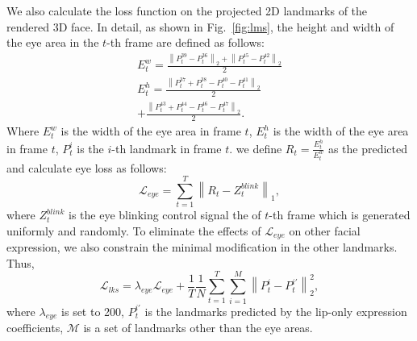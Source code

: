 We also calculate the loss function on the projected 2D landmarks of the rendered 3D face. In detail, as shown in Fig.~\ref{fig:lms}, the height and width of the eye area in the $t$-th frame are defined as follows:
\begin{align}
{E}^{w}_{t}=\frac{\left\|P^{39}_t-P^{36}_t \right\|_{2} + \left\|P^{45}_t-P^{42}_t \right\|_{2} }{2} \\
{E}^{h}_{t}=\frac{\left\|P^{37}_t+P^{38}_t-P^{40}_t-P^{41}_t \right\|_{2}}{2} \\ + 
\frac{\left\|P^{43}_t+P^{44}_t-P^{46}_t-P^{47}_t \right\|_{2} }{2}.
\end{align}
Where ${E^{w}_{t}}$ is the width of the eye area in frame ${t}$, ${E}^{h}_{t}$ is the width of the eye area in frame ${t}$, $P^{i}_t$ is the ${i}$-th landmark in frame ${t}$. we define ${R_t} = \frac{{E}^{h}_{t}}{{E}^{w}_{t}}$ as the predicted and calculate eye loss as follows:
\begin{equation}
\mathcal{L}_{eye}=\sum_{t=1}^{T} \left\|{R_t}-Z^{blink}_{t} \right\|_{1},
\end{equation}
where $Z^{blink}_{t}$ is the eye blinking control signal the of ${t}$-th frame which is generated uniformly and randomly. To eliminate the effects of $\mathcal{L}_{eye}$ on other facial expression, we also constrain the minimal modification in the other landmarks. Thus, 
\begin{equation}
    \mathcal{L}_{lks}= \lambda_{eye} \mathcal{L}_{eye} + \frac{1}{T} \frac{1}{N}  \sum_{t=1}^{T} \sum_{i=1}^{M} \left\|P^{i}_t-P^{i\prime}_{t}\right\|^{2}_{2},
\end{equation}
where $\lambda_{eye}$ is set to 200, $P^{i\prime}_{t}$ is the landmarks predicted by the lip-only expression coefficients, $\mathcal{M}$ is a set of landmarks other than the eye areas.




